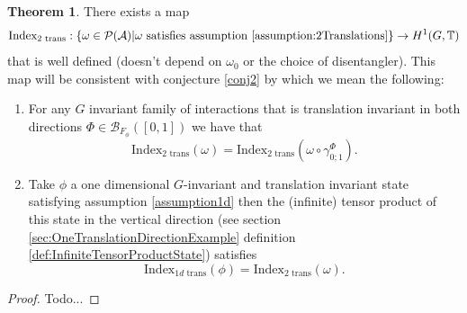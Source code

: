 \documentclass[12pt,a4paper,twoside]{article}
\newcommand{\BB}{\mathcal B}
\newcommand{\PP}{\mathcal P}
\newcommand{\TT}{\mathbb T}
\renewcommand{\AA}{\mathcal A}
\theoremstyle{definition}
\newtheorem{theorem}{Theorem}[section]
\numberwithin{equation}{section}
\begin{document}
\begin{theorem}
	There exists a map
	\begin{equation}
		\textrm{Index}_{2\text{ trans}}:\{\omega\in\PP(\AA)| \omega\text{ satisfies assumption \ref{assumption:2Translations}}\}\rightarrow H^1(G,\TT)
	\end{equation}
	that is well defined (doesn't depend on $\omega_0$ or the choice of disentangler). This map will be consistent with conjecture \ref{conj2} by which we mean the following:
	\begin{enumerate}
		\item For any $G$ invariant family of interactions that is translation invariant in both directions $\Phi\in\BB_{F_\phi}([0,1])$ we have that
		\begin{equation}
			\textrm{Index}_{2\text{ trans}}(\omega)=\textrm{Index}_{2\text{ trans}}(\omega\circ\gamma^\Phi_{0;1}).
		\end{equation}
		\item Take $\phi$ a one dimensional $G$-invariant and translation invariant state satisfying assumption \ref{assumption1d} then the (infinite) tensor product of this state in the vertical direction (see section \ref{sec:OneTranslationDirectionExample} definition \ref{def:InfiniteTensorProductState}) satisfies
		\begin{equation}
			\textrm{Index}_{1d\text{ trans}}(\phi)=\text{Index}_{2\text{ trans}}(\omega).
		\end{equation}
	\end{enumerate}
\end{theorem}
\begin{proof}
	{\color{red}Todo...}
\end{proof}
\end{document}
